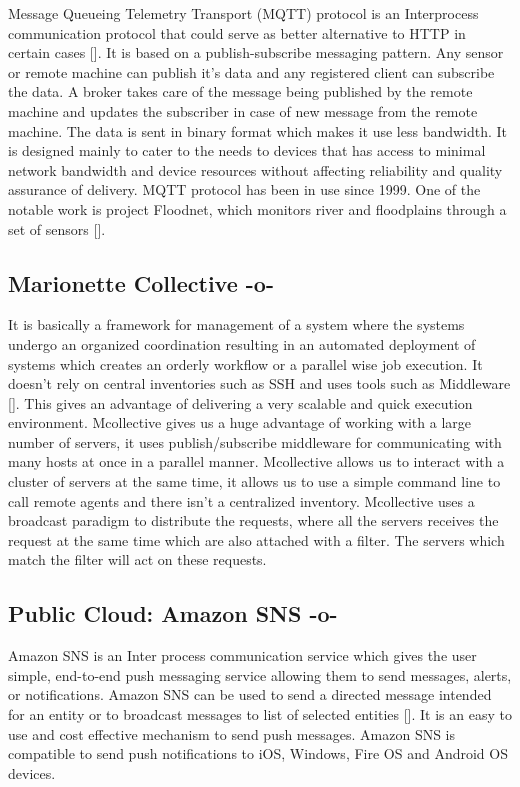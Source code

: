 Message Queueing Telemetry Transport (MQTT) protocol is an
Interprocess communication protocol that could serve as better
alternative to HTTP in certain cases [\cite{www-mqtt}]. It is based on a
publish-subscribe messaging pattern. Any sensor or remote machine can
publish it's data and any registered client can subscribe the data. A
broker takes care of the message being published by the remote machine
and updates the subscriber in case of new message from the remote
machine. The data is sent in binary format which makes it use less
bandwidth. It is designed mainly to cater to the needs to devices that
has access to minimal network bandwidth and device resources without
affecting reliability and quality assurance of delivery. MQTT protocol
has been in use since 1999. One of the notable work is project
Floodnet, which monitors river and floodplains through a set of
sensors [\cite{www-floodnet}].



\subsection{Marionette Collective -o-}

It is basically a framework for management of a system where the
systems undergo an organized coordination resulting in an automated
deployment of systems which creates an orderly workflow or a parallel
wise job execution. It doesn't rely on central inventories such as SSH
and uses tools such as Middleware [\cite{www-marionette-webpage}]. This
gives an advantage of delivering a very scalable and quick execution
environment.  Mcollective gives us a huge advantage of working with a
large number of servers, it uses publish/subscribe middleware for
communicating with many hosts at once in a parallel
manner. Mcollective allows us to interact with a cluster of servers at
the same time, it allows us to use a simple command line to call
remote agents and there isn't a centralized inventory. Mcollective
uses a broadcast paradigm to distribute the requests, where all the
servers receives the request at the same time which are also attached
with a filter. The servers which match the filter will act on these
requests.


     
\subsection{Public Cloud: Amazon SNS -o-}

Amazon SNS is an Inter process communication service which gives the
user simple, end-to-end push messaging service allowing them to send
messages, alerts, or notifications. Amazon SNS can be used to send a
directed message intended for an entity or to broadcast messages to
list of selected entities [\cite{www-sns-webpage}].  It is an easy to
use and cost effective mechanism to send push messages. Amazon SNS is
compatible to send push notifications to iOS, Windows, Fire OS and
Android OS devices.

